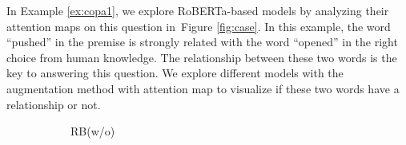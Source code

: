 \documentclass[runningheads]{llncs}
\newcommand{\figref}[1]{Figure \ref{#1}}
\newcommand{\exref}[1]{Example \ref{#1}}
\begin{document}
In \exref{ex:copa1}, we explore RoBERTa-based models by 
analyzing their attention maps on this question in~\figref{fig:case}.  
In this example, the word ``pushed'' in the premise is strongly
related with the word ``opened'' in the right choice from human knowledge. 
The relationship between these two words is the key to answering this question. 
We explore different models with the augmentation method with attention map 
to visualize if these two words have a relationship or not.
\begin{figure}[th!]
\centering
\begin{subfigure}[b]{0.40\textwidth}
\centering

\caption{RB(w/o)}
\label{fig:case_original}
\end{subfigure}
\hfill
\begin{subfigure}[b]{0.40\textwidth}
\centering

\end{subfigure}
\end{figure}
\end{document}
